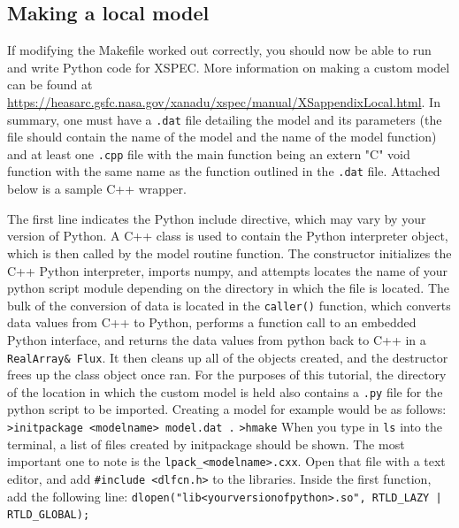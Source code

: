 \documentclass[12pt]{article}
\begin{document}
\subsection{Making a local model}\label{model}
If modifying the Makefile worked out correctly, you should now be able to run and write Python code for XSPEC. More information on making a custom model can be found at \url{https://heasarc.gsfc.nasa.gov/xanadu/xspec/manual/XSappendixLocal.html}. \newline
In summary, one must have a \texttt{.dat} file detailing the model and its parameters (the file should contain the name of the model and the name of the model function) and at least one \texttt{.cpp} file with the main function being an extern "C" void function with the same name as the function outlined in the \texttt{.dat} file. Attached below is a sample C++ wrapper. \newline

The first line indicates the Python include directive, which may vary by your version of Python. A C++ class is used to contain the Python interpreter object, which is then called by the model routine function. The constructor initializes the C++ Python interpreter, imports numpy, and attempts locates the name of your python script module depending on the directory in which the file is located. The bulk of the conversion of data is located in the \texttt{caller()} function, which converts data values from C++ to Python, performs a function call to an embedded Python interface, and returns the data values from python back to C++ in a \texttt{RealArray\& Flux}. It then cleans up all of the objects created, and the destructor frees up the class object once ran. \newline
For the purposes of this tutorial, the directory of the location in which the custom model is held also contains a \texttt{.py} file for the python script to be imported. Creating a model for example would be as follows: \newline
\indent\texttt{>initpackage <modelname> model.dat .}\newline
\indent\texttt{>hmake}\newline
When you type in \texttt{ls} into the terminal, a list of files created by initpackage should be shown. The most important one to note is the \texttt{lpack\_<modelname>.cxx}. Open that file with a text editor, and add \texttt{\#include <dlfcn.h>} to the libraries. Inside the first function, add the following line:\newline
\indent\texttt{dlopen("lib<yourversionofpython>.so", RTLD\_LAZY | RTLD\_GLOBAL);}
\end{document}

